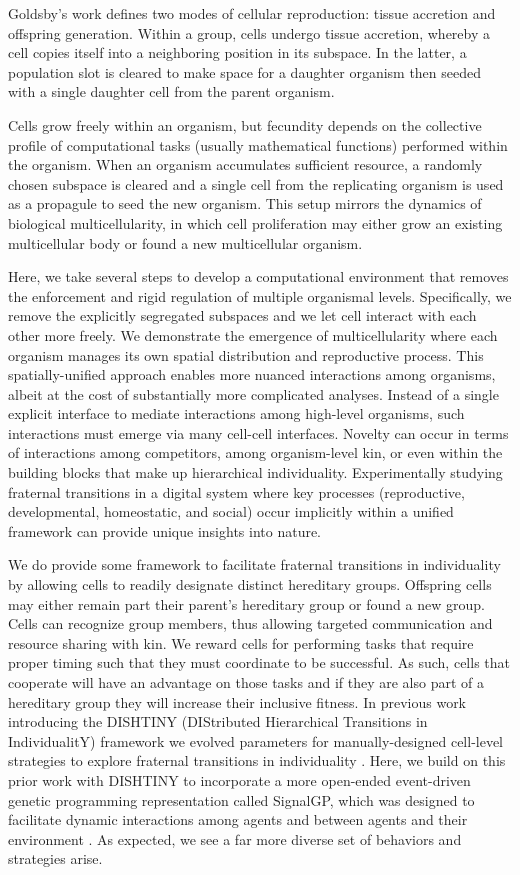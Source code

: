 Goldsby's work defines two modes of cellular reproduction: tissue accretion and offspring generation.
Within a group, cells undergo tissue accretion, whereby a cell copies itself into a neighboring position in its subspace.
In the latter, a population slot is cleared to make space for a daughter organism then seeded with a single daughter cell from the parent organism.

Cells grow freely within an organism, but fecundity depends on the collective profile of computational tasks (usually mathematical functions) performed within the organism.
When an organism accumulates sufficient resource, a randomly chosen subspace is cleared and a single cell from the replicating organism is used as a propagule to seed the new organism.
This setup mirrors the dynamics of biological multicellularity, in which cell proliferation may either grow an existing multicellular body or found a new multicellular organism.

Here, we take several steps to develop a computational environment that removes the enforcement and rigid regulation of multiple organismal levels.
Specifically, we remove the explicitly segregated subspaces and we let cell interact with each other more freely.
We demonstrate the emergence of multicellularity where each organism manages its own spatial distribution and reproductive process.
This spatially-unified approach enables more nuanced interactions among organisms, albeit at the cost of substantially more complicated analyses.
Instead of a single explicit interface to mediate interactions among high-level organisms, such interactions must emerge via many cell-cell interfaces.
Novelty can occur in terms of interactions among competitors, among organism-level kin, or even within the building blocks that make up hierarchical individuality.
Experimentally studying fraternal transitions in a digital system where key processes (reproductive, developmental, homeostatic, and social) occur implicitly within a unified framework can provide unique insights into nature.

We do provide some framework to facilitate fraternal transitions in individuality by allowing cells to readily designate distinct hereditary groups.
Offspring cells may either remain part their parent's hereditary group or found a new group.
Cells can recognize group members, thus allowing targeted communication and resource sharing with kin.
We reward cells for performing tasks that require proper timing such that they must coordinate to be successful.
As such, cells that cooperate will have an advantage on those tasks and if they are also part of a hereditary group they will increase their inclusive fitness.
In previous work introducing the DISHTINY (DIStributed Hierarchical Transitions in IndividualitY) framework we evolved parameters for manually-designed cell-level strategies to explore fraternal transitions in individuality \citep{moreno2019toward}.
Here, we build on this prior work with DISHTINY to incorporate a more open-ended event-driven genetic programming representation called SignalGP, which was designed to facilitate dynamic interactions among agents and between agents and their environment \citep{lalejini2018evolving}.
As expected, we see a far more diverse set of behaviors and strategies arise.
